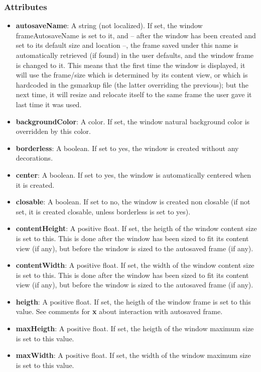 \subsubsection{Attributes}
\begin{itemize}
\item {\bf autosaveName}: A string (not localized).  If set, the window 
frameAutosaveName is set to it, and -- after the window has been
created and set to its default size and location --, the frame saved
under this name is automatically retrieved (if found) in the user
defaults, and the window frame is changed to it.  This means that the
first time the window is displayed, it will use the frame/size which
is determined by its content view, or which is hardcoded in the gsmarkup
file (the latter overriding the previous); but the next time, it will
resize and relocate itself to the same frame the user gave it last
time it was used.
\item {\bf backgroundColor}: A color.  If set, the window natural background
color is overridden by this color.
\item {\bf borderless}: A boolean.  If set to yes, the window is created 
without any decorations.
\item {\bf center}: A boolean.  If set to yes, the window is automatically 
centered when it is created.
\item {\bf closable}: A boolean.  If set to no, the window is created 
non closable (if not set, it is created closable, unless borderless is set to
yes).
\item {\bf contentHeight}: A positive float.  If set, the heigth of the window
content size is set to this.  This is done after the window has been
sized to fit its content view (if any), but before the window is sized
to the autosaved frame (if any).
\item {\bf contentWidth}: A positive float.  If set, the width of the window
content size is set to this.  This is done after the window has been sized
to fit its content view (if any), but before the window is sized to the
autosaved frame (if any).
\item {\bf heigth}: A positive float.  If set, the heigth
of the window frame is set to this value.  See comments for {\bf x}
about interaction with autosaved frame.
\item {\bf maxHeigth}: A positive float.  If set, the heigth
of the window maximum size is set to this value.
\item {\bf maxWidth}: A positive float.  If set, the width  
of the window maximum size is set to this value.

\end{itemize}

